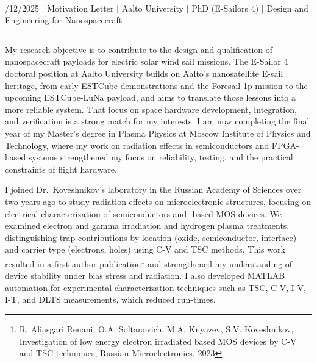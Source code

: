 \documentclass[a4paper,12pt]{article}
\begin{document}
\begin{center}
  {\Huge \scshape {\fontsize{25}{25}\selectfont{Reza}} {\fontsize{25}{25}}} \\ 
  \vspace{2pt}
  {\fontsize{10}{10}/12/2025} $|$
  {\fontsize{10}{10}\selectfont Motivation Letter} $|$
  {\fontsize{10}{10}\selectfont Aalto University} $|$
  {\fontsize{10}{10}\selectfont PhD (E-Sailors 4)} $|$
  {\fontsize{10}{10}\selectfont Design and Engineering for Nanospacecraft}
\end{center}

\vspace{-20pt}
\noindent\rule{\textwidth}{0.5pt}

My research objective is to contribute to the design and qualification of nanospacecraft payloads for electric solar wind sail missions. The E-Sailor 4 doctoral position at Aalto University builds on Aalto's nanosatellite E-sail heritage, from early ESTCube demonstrations and the Foresail-1p mission to the upcoming ESTCube-LuNa payload, and aims to translate those lessons into a more reliable system. That focus on space hardware development, integration, and verification is a strong match for my interests. I am now completing the final year of my Master's degree in Plasma Physics at Moscow Institute of Physics and Technology, where my work on radiation effects in semiconductors and FPGA-based systems strengthened my focus on reliability, testing, and the practical constraints of flight hardware.

\vspace{10pt}
I joined Dr.\ Koveshnikov's laboratory in the Russian Academy of Sciences over two years ago to study radiation effects on microelectronic structures, focusing on electrical characterization of semiconductors and -based MOS devices. We examined electron and gamma irradiation and hydrogen plasma treatments, distinguishing trap contributions by location (oxide, semiconductor, interface) and carrier type (electrons, holes) using C-V and TSC methods. This work resulted in a first-author publication\footnote{R. Aliasgari Renani, O.A. Soltanovich, M.A. Knyazev, S.V. Koveshnikov, Investigation of low energy electron irradiated  based MOS devices by C-V and TSC techniques, Russian Microelectronics, 2023} and strengthened my understanding of device stability under bias stress and radiation. I also developed MATLAB automation for experimental characterization techniques such as TSC, C-V, I-V, I-T, and DLTS measurements, which reduced run-times.
\end{document}
